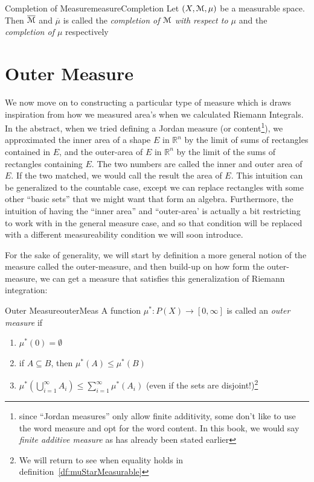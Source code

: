 \documentclass[oneside]{book}
\newcommand{\R}{\mathbb{R}}
\newcommand{\MM}{\EuScript{M}}
\newcommand{\sse}{\subseteq}
\newcommand{\oln}{\overline}
\newcommand{\rw}{\rightarrow}
\begin{document}
\begin{defn}{Completion of Measure}{measureCompletion}
	Let $(X, \MM, \mu)$ be a measurable space. Then $\oln{\MM}$ and $\oln{\mu}$ is called the \emph{completion of $\MM$
	with respect to $\mu$} and the \emph{completion of $\mu$} respectively
\end{defn}

\section{Outer Measure}

We now move on to constructing a particular type of measure which is draws inspiration from how we measured area's when
we calculated Riemann Integrals. In the abstract, when we tried defining a Jordan measure (or content\footnote{since
``Jordan measures'' only allow finite additivity, some don't like to use the word measure and opt for the word
content. In this book, we would say \emph{finite additive measure} as has already been stated earlier}), we
approximated the inner area of a shape $E$ in $\R^n$ by the limit of sums of rectangles contained in $E$, and the outer-area of $E$ in
$\R^n$ by the limit of the sums of rectangles containing $E$. The two numbers are called the inner and outer area of
$E$. If the two matched, we would call the result the area of $E$. This intuition can be generalized to the countable
case, except we can replace rectangles with some other ``basic sets'' that we might want that form an algebra.
Furthermore, the intuition of having the ``inner area'' and ``outer-area' is actually a bit restricting to work with in
the general measure case, and so that condition will be replaced with a different measureability condition we will soon
introduce. 

For the sake of generality, we will start by definition a more general notion of the measure called the outer-measure,
and then build-up on how form the outer-measure, we can get a measure that satisfies this generalization of Riemann
integration:

\begin{defn}{Outer Measure}{outerMeas}
	A function $\mu^*: P(X) \rw [0,\infty]$ is called an \emph{outer measure} if
	\begin{enumerate}
		\item $\mu^*(0) = \emptyset$
		\item if $A \sse B$, then $\mu^*(A) \le \mu^*(B)$
		\item $\mu^*\left(\bigcup_{i=1}^\infty A_i\right) \le \sum_{i=1}^\infty \mu^*(A_i)$ (even if the sets are
			disjoint!)\footnote{We will return to see when equality holds in definition~\ref{df:muStarMeasurable}}
	\end{enumerate}
\end{defn}
\end{document}
